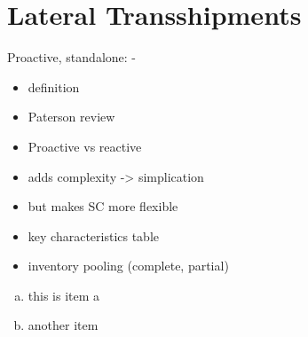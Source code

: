 \documentclass[../../main.tex]{subfiles}
\begin{document}

\newcommand{\headerline}[3]{%
  \par\medskip\noindent
  \makebox[0pt][l]{#1}%
  \makebox[\textwidth][c]{#2}%
  \makebox[0pt][r]{\texttt{#3}}\par\medskip}

\iffalse
\hspace*{\fill}
{ILLUSTRATION 1} \hfill {ILLUSTRATION 2}
\hspace*{\fill}
\fi

\iffalse
\begin{enumerate}[a)]
    \item \hfill$\begin{aligned}[t]
        &h_i + p_j - c_{ij} - (c_i - c_j) \geq 0
    \end{aligned}$\hfill\null
    \item \hfill$\begin{aligned}[t]
        &c_{ij} + (c_i - c_j) - (h_i - h_j) \geq 0
    \end{aligned}$\hfill\null
    \item \hfill$\begin{aligned}[t]
        &c_{ij} + (c_i - c_j) - (p_i - p_j) \geq 0
    \end{aligned}$\hfill\null
\end{enumerate}
\fi

\section{Lateral Transshipments}

Proactive, standalone:
- 

\begin{itemize}
\item definition
\item Paterson review
\item Proactive vs reactive
\item adds complexity -> simplication
\item but makes SC more flexible
\item key characteristics table
\item inventory pooling (complete, partial)
\end{itemize}

\begin{enumerate}[a)]
\item this is item a
\item another item
\end{enumerate}
\end{document}
